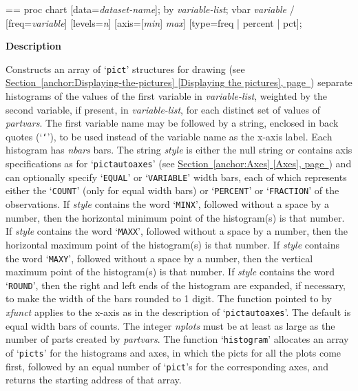 \documentclass{book}
\makeatletter
\newcommand\Texinfocommandstyletextvar[1]{{\normalfont{}\textsl{#1}}}%
\newenvironment{Texinfopreformatted}{%
  \par\GNUTobeylines\obeyspaces\frenchspacing\parskip=\z@\parindent=\z@}{}
{\catcode`\^^M=13 \gdef\GNUTobeylines{\catcode`\^^M=13 \def^^M{\null\par}}}
\newenvironment{Texinfoindented}{\begin{list}{}{}\item\relax}{\end{list}}
\renewcommand{\_}{\Texinfounderscore\discretionary{}{}{}}
\makeatother
\begin{document}
\begin{Texinfoindented}
\begin{Texinfopreformatted}%
proc chart [data=\Texinfocommandstyletextvar{dataset-name}];
by \Texinfocommandstyletextvar{variable-list};
vbar \Texinfocommandstyletextvar{variable} / [freq=\Texinfocommandstyletextvar{variable}] [levels=\Texinfocommandstyletextvar{n}]
                  [axis=[\Texinfocommandstyletextvar{min}] \Texinfocommandstyletextvar{max}]
                  [type=freq | percent | pct];
\end{Texinfopreformatted}
\end{Texinfoindented}

%

\noindent{}\textbf{Description}

Constructs an array of `\texttt{pict}' structures for
drawing (see \hyperref[anchor:Displaying-the-pictures]{Section~\ref*{anchor:Displaying-the-pictures} [Displaying the pictures], page~\pageref*{anchor:Displaying-the-pictures}})
separate histograms of the values of the first variable in
\Texinfocommandstyletextvar{variable-list}, weighted by the second variable, if present, in
\Texinfocommandstyletextvar{variable-list}, for each distinct set of values of
\Texinfocommandstyletextvar{partvars}.
The first variable name may be followed by a string, enclosed in back quotes (`\texttt{`}'),
to be used instead of the variable name as the x-axis label.
Each histogram has \Texinfocommandstyletextvar{nbars} bars.
The string \Texinfocommandstyletextvar{style} is either the null string or
contains axis specifications as for `\texttt{pict\_autoaxes}' (see \hyperref[anchor:Axes]{Section~\ref*{anchor:Axes} [Axes], page~\pageref*{anchor:Axes}})
and can optionally specify
`\texttt{EQUAL}' or `\texttt{VARIABLE}' width bars, each of which represents either the `\texttt{COUNT}'
(only for equal width bars) or `\texttt{PERCENT}' or `\texttt{FRACTION}' of the observations.
If \Texinfocommandstyletextvar{style} contains the word `\texttt{MINX}', followed without a space by a number,
then the horizontal minimum point of the histogram(s) is that number. 
If \Texinfocommandstyletextvar{style} contains the word `\texttt{MAXX}', followed without a space by a number,
then the horizontal maximum point of the histogram(s) is that number. 
If \Texinfocommandstyletextvar{style} contains the word `\texttt{MAXY}', followed without a space by a number,
then the vertical maximum point of the histogram(s) is that number. 
If \Texinfocommandstyletextvar{style} contains the word `\texttt{ROUND}',
then the right and left ends of the histogram are expanded,
if necessary, to make the width of the bars rounded to 1 digit.
The function pointed to by \Texinfocommandstyletextvar{xfunct} applies to the x-axis as in the description of
`\texttt{pict\_autoaxes}'.
The default is equal width bars of counts.
The integer \Texinfocommandstyletextvar{nplots}
must be at least as large as the number of parts created by
\Texinfocommandstyletextvar{partvars}.
The function `\texttt{histogram}'
allocates an array of `\texttt{picts}' for the histograms and axes, in which the
picts for all the plots come first, followed by an equal number of `\texttt{pict}'s for the
corresponding axes, and returns the starting address of that array.
\end{document}

